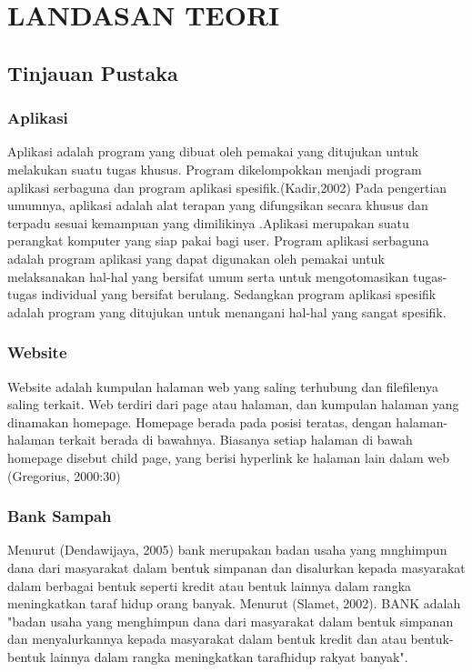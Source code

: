 \chapter{LANDASAN TEORI}
\label{sec:landasan_teori}

\section{Tinjauan Pustaka}
\subsection{Aplikasi}
Aplikasi adalah program yang dibuat oleh pemakai yang ditujukan untuk melakukan suatu tugas khusus. Program dikelompokkan menjadi program aplikasi serbaguna dan program aplikasi spesifik.(Kadir,2002)
Pada pengertian umumnya, aplikasi adalah alat terapan yang difungsikan secara khusus dan terpadu sesuai kemampuan yang dimilikinya .Aplikasi merupakan suatu perangkat komputer yang siap pakai bagi user. Program aplikasi serbaguna adalah program aplikasi yang dapat digunakan oleh pemakai untuk melaksanakan hal-hal yang bersifat umum serta untuk mengotomasikan tugas-tugas individual yang bersifat berulang. Sedangkan program aplikasi spesifik adalah program yang ditujukan untuk menangani hal-hal yang sangat spesifik.

\subsection{Website}
Website adalah kumpulan halaman web yang saling terhubung dan filefilenya saling terkait. Web terdiri dari page atau halaman, dan kumpulan halaman yang dinamakan homepage. Homepage berada pada posisi teratas, dengan halaman-halaman terkait berada di bawahnya. Biasanya setiap halaman di bawah homepage disebut child page, yang berisi hyperlink ke halaman lain dalam web (Gregorius, 2000:30)

\subsection{Bank Sampah} 
Menurut (Dendawijaya, 2005) bank merupakan badan usaha yang mnghimpun dana dari masyarakat dalam bentuk simpanan dan disalurkan kepada masyarakat dalam berbagai bentuk seperti kredit atau bentuk lainnya dalam rangka meningkatkan taraf hidup orang banyak. Menurut (Slamet, 2002). BANK adalah "badan usaha yang menghimpun dana dari masyarakat dalam bentuk simpanan dan menyalurkannya kepada masyarakat dalam bentuk kredit dan atau bentuk-bentuk lainnya dalam rangka meningkatkan tarafhidup rakyat banyak".

